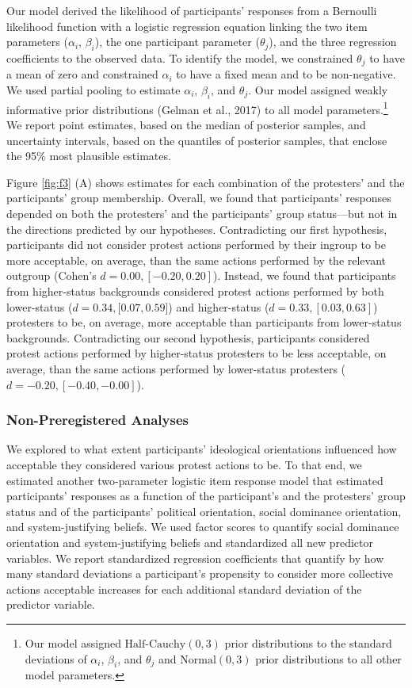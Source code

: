 \documentclass[12pt, letterpaper]{article}
\begin{document}
Our model derived the likelihood of participants' responses from a
Bernoulli likelihood function with a logistic regression equation
linking the two item parameters (\(\alpha_i\), \(\beta_i\)), the one
participant parameter (\(\theta_j\)), and the three regression
coefficients to the observed data. To identify the model, we constrained
\(\theta_j\) to have a mean of zero and constrained \(\alpha_i\) to have
a fixed mean and to be non-negative. We used partial pooling to estimate
\(\alpha_i\), \(\beta_i\), and \(\theta_j\). Our model assigned weakly
informative prior distributions (Gelman et al., 2017) to all model
parameters.\footnote{Our model assigned \(\text{Half-Cauchy} (0, 3)\)
  prior distributions to the standard deviations of \(\alpha_i\),
  \(\beta_i\), and \(\theta_j\) and \(\text{Normal} (0, 3)\) prior
  distributions to all other model parameters.} We report point
estimates, based on the median of posterior samples, and uncertainty
intervals, based on the quantiles of posterior samples, that enclose the
95\% most plausible estimates.

Figure \ref{fig:f3} (A) shows estimates for each combination of the
protesters' and the participants' group membership. Overall, we found
that participants' responses depended on both the protesters' and the
participants' group status---but not in the directions predicted by our
hypotheses. Contradicting our first hypothesis, participants did not
consider protest actions performed by their ingroup to be more
acceptable, on average, than the same actions performed by the relevant
outgroup (Cohen's \(d = 0.00, [-0.20, 0.20]\)). Instead, we found that
participants from higher-status backgrounds considered protest actions
performed by both lower-status (\(d = 0.34, [0.07, 0.59\){]}) and
higher-status (\(d = 0.33, [0.03, 0.63]\)) protesters to be, on average,
more acceptable than participants from lower-status backgrounds.
Contradicting our second hypothesis, participants considered protest
actions performed by higher-status protesters to be less acceptable, on
average, than the same actions performed by lower-status protesters
(\(d = -0.20, [-0.40, -0.00]\)).

\hypertarget{non-preregistered-analyses}{%
\subsubsection{Non-Preregistered
Analyses}\label{non-preregistered-analyses}}

We explored to what extent participants' ideological orientations
influenced how acceptable they considered various protest actions to be.
To that end, we estimated another two-parameter logistic item response
model that estimated participants' responses as a function of the
participant's and the protesters' group status and of the participants'
political orientation, social dominance orientation, and
system-justifying beliefs. We used factor scores to quantify social
dominance orientation and system-justifying beliefs and standardized all
new predictor variables. We report standardized regression coefficients
that quantify by how many standard deviations a participant's propensity
to consider more collective actions acceptable increases for each
additional standard deviation of the predictor variable.
\end{document}
